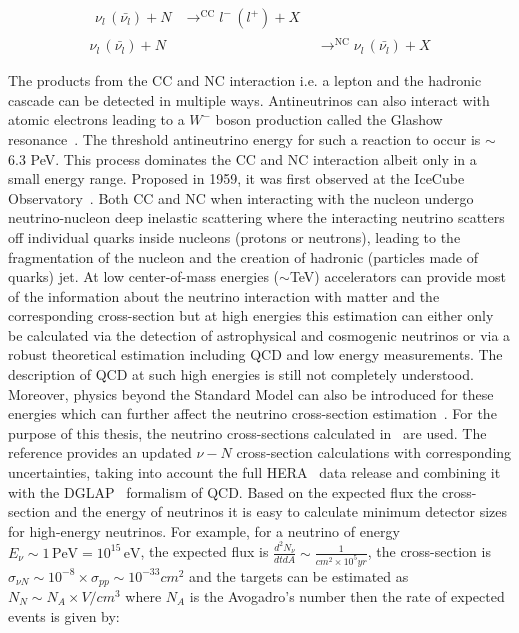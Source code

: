 \begin{subequations}\label{eq:NuCC_NC}
  \begin{align}
    \begin{split}
      \nu_l \, (\bar{\nu_l}) + N &\mathop{\longrightarrow}^{\mathrm{CC}} l^- \, (l^+) + X 
    \end{split} \\
    \nu_l \, (\bar{\nu_l}) + N &\mathop{\longrightarrow}^{\mathrm{NC}} \nu_l \, (\bar{\nu_l}) + X
  \end{align}
\end{subequations}

The products from the CC and NC interaction i.e. a lepton and the hadronic cascade can be detected in multiple ways. 
Antineutrinos can also interact with atomic electrons leading to a $W^-$ boson production called the Glashow resonance~\cite{PhysRev.118.316}. The threshold antineutrino energy for such a reaction to occur is $\sim$6.3 PeV. This process dominates the CC and NC interaction albeit only in a small energy range. Proposed in 1959, it was first observed at the IceCube Observatory~\cite{IceCube:2021rpz}. Both CC and NC when interacting with the nucleon undergo neutrino-nucleon deep inelastic scattering where the interacting neutrino scatters off individual quarks inside nucleons (protons or neutrons), leading to the fragmentation of the nucleon and the creation of hadronic (particles made of quarks) jet. At low center-of-mass energies ($\sim$TeV) accelerators can provide most of the information about the neutrino interaction with matter and the corresponding cross-section but at high energies this estimation can either only be calculated via the detection of astrophysical and cosmogenic neutrinos or via a robust theoretical estimation including \gls{QCD} and low energy measurements. The description of \gls*{QCD} at such high energies is still not completely understood. Moreover, physics beyond the Standard Model can also be introduced for these energies which can further affect the neutrino cross-section estimation~\cite{PhysRevD.107.033009}. For the purpose of this thesis, the neutrino cross-sections calculated in~\cite{Cooper_Sarkar_2011} are used. The reference provides an updated $\nu -N$ cross-section calculations with corresponding uncertainties, taking into account the full HERA~\cite{aaron2010combined} data release and combining it with the DGLAP~\cite{ALTARELLI1977298,Dokshitzer:1977sg,Gribov:427157} formalism of QCD. Based on the expected flux the cross-section and the energy of neutrinos it is easy to calculate minimum detector sizes for high-energy neutrinos. For example, for a neutrino of energy $E_{\nu} \sim 1\,\text{PeV} = 10^{15}\,\text{eV}$, the expected flux is $\frac{d^2N_{\nu}}{dt dA} \sim \frac{1}{cm^2 \times 10^5 yr}$, the cross-section is $\sigma_{\nu N} \sim 10^{-8} \times \sigma_{pp} \sim 10^{-33} cm^2$ and the targets can be estimated as $ N_N \sim N_A \times V/cm^3$ where $N_A$ is the Avogadro's number then the rate of expected events is given by:

